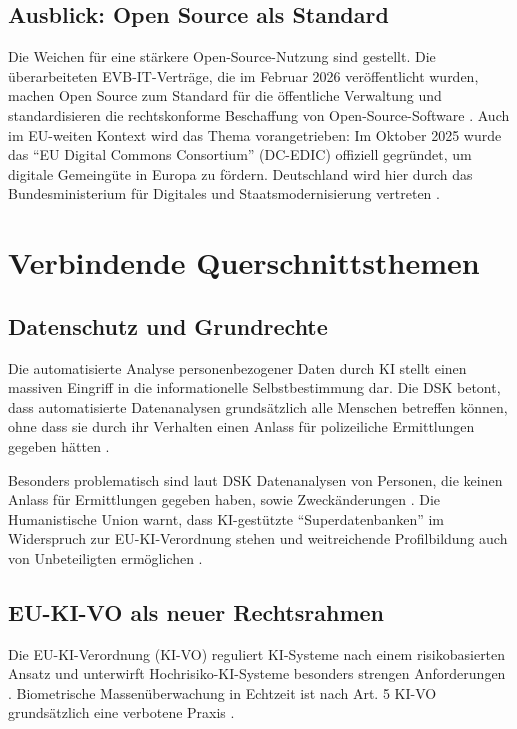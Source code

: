 \documentclass[12pt,a4paper]{article}
\begin{document}
	\subsection{Ausblick: Open Source als Standard}
	
	Die Weichen für eine stärkere Open-Source-Nutzung sind gestellt. Die überarbeiteten EVB-IT-Verträge, die im Februar 2026 veröffentlicht wurden, machen Open Source zum Standard für die öffentliche Verwaltung und standardisieren die rechtskonforme Beschaffung von Open-Source-Software \cite{ZenDiS2025}. Auch im EU-weiten Kontext wird das Thema vorangetrieben: Im Oktober 2025 wurde das \enquote{EU Digital Commons Consortium} (DC-EDIC) offiziell gegründet, um digitale Gemeingüte in Europa zu fördern. Deutschland wird hier durch das Bundesministerium für Digitales und Staatsmodernisierung vertreten \cite{ZenDiS2025}.
	
	\section{Verbindende Querschnittsthemen}
	
	\subsection{Datenschutz und Grundrechte}
	
	Die automatisierte Analyse personenbezogener Daten durch KI stellt einen massiven Eingriff in die informationelle Selbstbestimmung dar. Die DSK betont, dass automatisierte Datenanalysen grundsätzlich alle Menschen betreffen können, ohne dass sie durch ihr Verhalten einen Anlass für polizeiliche Ermittlungen gegeben hätten \cite{DSK2025}.
	
	Besonders problematisch sind laut DSK Datenanalysen von Personen, die keinen Anlass für Ermittlungen gegeben haben, sowie Zweckänderungen \cite{Datenschutzticker2025}. Die Humanistische Union warnt, dass KI-gestützte \enquote{Superdatenbanken} im Widerspruch zur EU-KI-Verordnung stehen und weitreichende Profilbildung auch von Unbeteiligten ermöglichen \cite{HumanUnion2025}.
	
	\subsection{EU-KI-VO als neuer Rechtsrahmen}
	
	Die EU-KI-Verordnung (KI-VO) reguliert KI-Systeme nach einem risikobasierten Ansatz und unterwirft Hochrisiko-KI-Systeme besonders strengen Anforderungen \cite{Kriminalpolizei2026}. Biometrische Massenüberwachung in Echtzeit ist nach Art. 5 KI-VO grundsätzlich eine verbotene Praxis \cite{RAV2025}.
	
\end{document}
